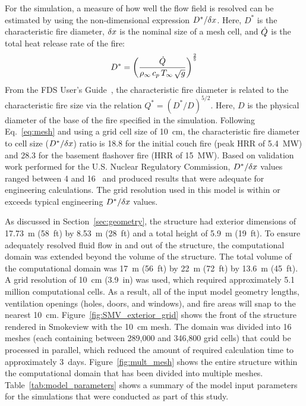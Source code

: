 \documentclass[12pt,oneside]{book}
\begin{document}
For the simulation, a measure of how well the flow field is resolved can be estimated by using the non-dimensional expression $D^*/\delta x$. Here, $D^*$ is the characteristic fire diameter, $\delta x$ is the nominal size of a mesh cell, and $\dot{Q}$ is the total heat release rate of the fire:
\begin{equation}
D^* = \left(
     \frac{\dot{Q}}{\rho_\infty \, c_p \, T_\infty \, \sqrt{g}}
     \right)^\frac{2}{5} 
\label{eq:mesh}
\end{equation}
From the FDS User's Guide~\cite{FDS_Users_Guide}, the characteristic fire diameter is related to the characteristic fire size via the relation $Q^* = (D^*/D)^{5/2}$. Here, $D$ is the physical diameter of the base of the fire specified in the simulation. Following Eq.~\ref{eq:mesh} and using a grid cell size of 10~cm, the characteristic fire diameter to cell size ($D^*/\delta x$) ratio is 18.8 for the initial couch fire (peak HRR of 5.4~MW) and 28.3 for the basement flashover fire (HRR of 15~MW). Based on validation work performed for the U.S. Nuclear Regulatory Commission, $D^*/\delta x$ values ranged between 4 and 16~\cite{NUREG_1824} and produced results that were adequate for engineering calculations. The grid resolution used in this model is within or exceeds typical engineering $D^*/\delta x$ values.

As discussed in Section~\ref{sec:geometry}, the structure had exterior dimensions of 17.73~m (58~ft) by 8.53~m (28~ft) and a total height of 5.9~m (19~ft). To ensure adequately resolved fluid flow in and out of the structure, the computational domain was extended beyond the volume of the structure. The total volume of the computational domain was 17~m (56~ft) by 22~m (72~ft) by 13.6~m (45~ft). A grid resolution of 10~cm (3.9~in) was used, which required approximately 5.1 million computational cells. As a result, all of the input model geometry lengths, ventilation openings (holes, doors, and windows), and fire areas will snap to the nearest 10~cm. Figure~\ref{fig:SMV_exterior_grid} shows the front of the structure rendered in Smokeview with the 10~cm mesh. The domain was divided into 16 meshes (each containing between 289,000 and 346,800 grid cells) that could be processed in parallel, which reduced the amount of required calculation time to approximately 3~days. Figure~\ref{fig:mult_mesh} shows the entire structure within the computational domain that has been divided into multiple meshes. Table~\ref{tab:model_parameters} shows a summary of the model input parameters for the simulations that were conducted as part of this study.
\end{document}
